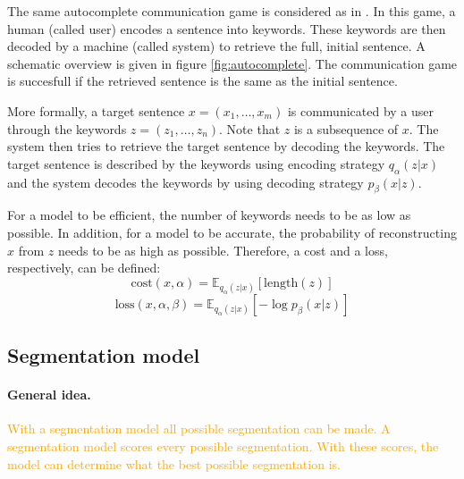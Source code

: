 \documentclass[a4paper, 12pt]{report}
\begin{document}
The same autocomplete communication game is considered as in . In this game, a human (called user) encodes a sentence into keywords. 
These keywords are then decoded by a machine (called system) to retrieve the full, initial sentence. 
A schematic overview is given in figure \ref{fig:autocomplete}. 
The communication game is succesfull if the retrieved sentence is the same as the initial sentence. 

More formally, a target sentence $x=(x_1, \dots, x_m)$ is communicated by a user through the keywords $z=(z_1, \dots, z_n)$. 
Note that $z$ is a subsequence of $x$. 
The system then tries to retrieve the target sentence by decoding the keywords. 
The target sentence is described by the keywords using encoding strategy $q_{\alpha}(z | x)$ and the system decodes the keywords by using decoding strategy $p_{\beta}(x|z)$. 

For a model to be efficient, the number of keywords needs to be as low as possible. 
In addition, for a model to be accurate, the probability of reconstructing $x$ from $z$ needs to be as high as possible. 
Therefore, a cost and a loss, respectively, can be defined:
\begin{equation}
    \label{eq:cost}
    \text{cost}(x,\alpha) = \mathbb{E}_{q_{\alpha}(z|x)} [\text{length}(z)]
\end{equation}
\begin{equation}
    \label{eq:loss}
    \text{loss}(x,\alpha,\beta) = \mathbb{E}_{q_{\alpha}(z|x)} [-\log p_{\beta}(x|z)]
\end{equation}

\subsection{Segmentation model}

\paragraph{General idea.}
\textcolor{orange}{With a segmentation model all possible segmentation can be made. 
A segmentation model scores every possible segmentation.
With these scores, the model can determine what the best possible segmentation is.}
\end{document}
